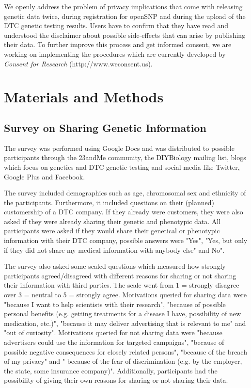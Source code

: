 \documentclass[10pt]{article}
\begin{document}
We openly address the problem of privacy implications that come with releasing genetic data twice, during registration for openSNP and during the upload of the DTC genetic testing results. Users have to confirm that they have read and understood the disclaimer about possible side-effects that can arise by publishing their data. To further improve this process and get informed consent, we are working on implementing the procedures which are currently developed by \textit{Consent for Research} (http://www.weconsent.us).
 
\section*{Materials and Methods}
\subsection*{Survey on Sharing Genetic Information}
The survey was performed using Google Docs and was distributed to possible participants through the 23andMe community, the DIYBiology mailing list, blogs which focus on genetics and DTC genetic testing and social media like Twitter, Google Plus and Facebook.  

The survey included demographics such as age, chromosomal sex and ethnicity of the participants. Furthermore, it included questions on their (planned) customership of a DTC company. If they already were customers, they were also asked if they were already sharing their genetic and phenotypic data. All participants were asked if they would share their genetical or phenotypic information with their DTC company, possible answers were "Yes", "Yes, but only if they did not share my medical information with anybody else" and No".

The survey also asked some scaled questions which measured how strongly participants agreed/disagreed with different reasons for sharing or not sharing their information with third parties. The scale went from 1 = strongly disagree over 3 = neutral to  5 = strongly agree. Motivations queried for sharing data were "because I want to help scientists with their research", "because of possible personal benefits (e.g. getting treatments for a disease I have, possibility of new medication, etc.)", "because it may deliver advertising that is relevant to me" and "out of curiosity". Motivations queried for not sharing data were "because advertisers could use the information for targeted campaigns", "because of possible negative consequences for closely related persons", "because of the breach of my privacy" and " because of the fear of discrimination (e.g. by the employer, the state, some insurance company)". Additionally, participants had the possibility of giving their own reasons for sharing or not sharing their data.
\end{document}
